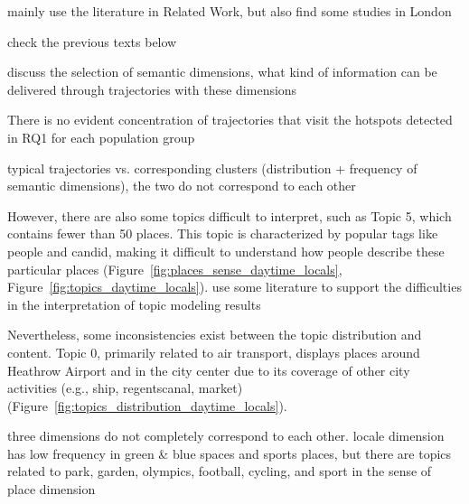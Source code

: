 \documentclass{article}
\theoremstyle{remark}
\begin{document}



mainly use the literature in Related Work, but also find some studies in London

check the previous texts below

discuss the selection of semantic dimensions, what kind of information can be delivered through trajectories with these dimensions

There is no evident concentration of trajectories that visit the hotspots detected in RQ1 for each population group

typical trajectories vs. corresponding clusters (distribution + frequency of semantic dimensions), the two do not correspond to each other

However, there are also some topics difficult to interpret, such as Topic 5, which contains fewer than 50 places. This topic is characterized by popular tags like people and candid, making it difficult to understand how people describe these particular places (Figure~\ref{fig:places_sense_daytime_locals}, Figure~\ref{fig:topics_daytime_locals}).
use some literature to support the difficulties in the interpretation of topic modeling results

Nevertheless, some inconsistencies exist between the topic distribution and content. Topic 0, primarily related to air transport, displays places around Heathrow Airport and in the city center due to its coverage of other city activities (e.g., ship, regentscanal, market) (Figure~\ref{fig:topics_distribution_daytime_locals}).

three dimensions do not completely correspond to each other. locale dimension has low frequency in green \& blue spaces and sports places, but there are topics related to park, garden, olympics, football, cycling, and sport in the sense of place dimension
\end{document}
